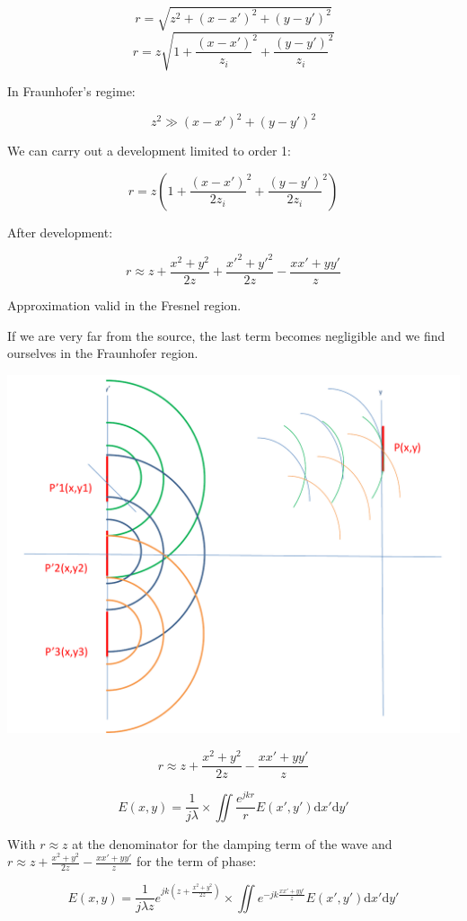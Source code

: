 \documentclass[10pt,a4paper]{article}
\begin{document}
\[r=\sqrt{z^2+(x-x')^2+(y-y')^2}\]
\[r=z\sqrt{1+\frac{(x-x')}{z_i}^2+\frac{(y-y')}{z_i}^2}\]

In Fraunhofer’s regime:

\[z^2\gg(x-x')^2+(y-y')^2\]

We can carry out a development limited to order 1: 

\[r=z\left(1+\frac{(x-x')}{2z_i}^2+\frac{(y-y')}{2z_i}^2\right)\]

After development:

\[r \approx z+\frac{x^2+y^2}{2z}+\frac{x'^2+y'^2}{2z}-\frac{xx'+yy'}{z}\]

Approximation valid in the Fresnel region. 

If we are very far from the source, the last term becomes negligible and we find ourselves in the Fraunhofer region.

\begin{center}
\includegraphics[scale=0.32]{../Ressources/schema-3-crop.png}
\end{center}

\[r \approx z+\frac{x^2+y^2}{2z}-\frac{xx'+yy'}{z}\]

\[
E(x,y)=\frac{1}{j\lambda} 
\times \iint \frac{e^{jkr}}{r}
E(x',y')\mathrm{d}x'\mathrm{d}y'
\]

With $r\approx z$ at the denominator for the damping term of the wave and $r \approx z+\frac{x^2+y^2}{2z}-\frac{xx'+yy'}{z}$ for the term of phase:

\[
E(x,y)=\frac{1}{j\lambda z} e^{jk\left(z+\frac{x^2+y^2}{2z}\right)}
\times \iint e^{-jk\frac{xx'+yy'}{z}}
E(x',y')\mathrm{d}x'\mathrm{d}y'
\]
\end{document}
